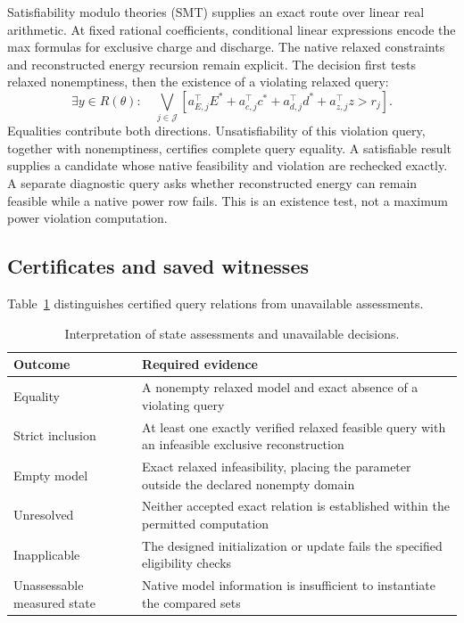 Satisfiability modulo theories (SMT) supplies an exact route over linear
real arithmetic. At fixed rational coefficients, conditional linear
expressions encode the max formulas for exclusive charge and discharge.
The native relaxed constraints and reconstructed energy recursion remain
explicit. The decision first tests relaxed nonemptiness, then the existence
of a violating relaxed query:
\begin{equation}
\exists y\in R(\theta):\quad
\bigvee_{j\in\mathcal J}
\left[a_{E, j}^\top E^*+a_{c, j}^\top c^*
+a_{d, j}^\top d^*+a_{z, j}^\top z>r_j\right].\label{eq:smt_violation}
\end{equation}
Equalities contribute both directions. Unsatisfiability of this violation
query, together with nonemptiness, certifies complete query equality.
A satisfiable result supplies a candidate whose native feasibility and
violation are rechecked exactly. A separate diagnostic query asks whether
reconstructed energy can remain feasible while a native power row fails.
This is an existence test, not a maximum power violation computation.

\subsection{Certificates and saved witnesses}
Table~\ref{tab:semantics} distinguishes certified query relations from unavailable assessments.

\begin{table}[htbp]
\caption{Interpretation of state assessments and unavailable decisions.}\label{tab:semantics}
\begin{tabularx}{\linewidth}{@{}p{.20\linewidth} X@{}}\toprule
Outcome & Required evidence\\\midrule
Equality & A nonempty relaxed model and exact absence of a violating query\\
Strict inclusion & At least one exactly verified relaxed feasible query with an infeasible exclusive reconstruction\\
Empty model & Exact relaxed infeasibility, placing the parameter outside the declared nonempty domain\\
Unresolved & Neither accepted exact relation is established within the permitted computation\\
Inapplicable & The designed initialization or update fails the specified eligibility checks\\
Unassessable measured state & Native model information is insufficient to instantiate the compared sets\\
\bottomrule\end{tabularx}
\end{table}

